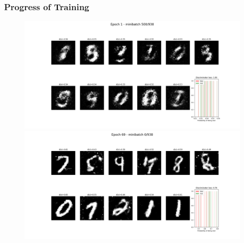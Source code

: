 \documentclass[12pt, fleqn, titlepage]{article}
\newcommand{\1}[1]{\mathds{1}\left[#1\right]}
\begin{document}
\subsubsection{Progress of Training}

\begin{figure}[H]
	\centering
	\includegraphics[width=\linewidth]{imgs/MNIST_GAN_normal_result_epoch_0_minibatch_500}
	\hfill
	\includegraphics[width=\linewidth]{imgs/MNIST_GAN_normal_result_epoch_68_minibatch_0}
\end{figure}
\end{document}
